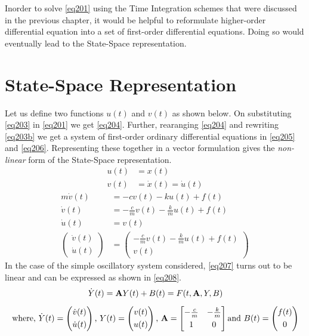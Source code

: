 Inorder to solve \cref{eq201} using the Time Integration schemes that were discussed in the previous chapter, it would be helpful to reformulate higher-order differential equation into a set of first-order differential equations. Doing so would eventually lead to the State-Space representation.
\section{State-Space Representation}
Let us define two functions $u(t)$ and $v(t)$ as shown below. On substituting \cref{eq203} in \cref{eq201} we get \cref{eq204}. Further, rearanging \cref{eq204} and rewriting \cref{eq203b} we get a system of first-order ordinary differential equations in \cref{eq205} and \cref{eq206}. Representing these together in a vector formulation gives the \emph{non-linear} form of the State-Space representation. 
\begin{subequations}\label{eq203}
\begin{align}
u(t) &= x(t) \label{eq203a}\\
v(t) &= \dot{x}(t) = \dot{u}(t)\label{eq203b}
\end{align}
\end{subequations}
\begin{align}
m \dot{v}(t) &= -cv(t) - ku(t) + f(t) \label{eq204}\\
\dot{v}(t) &= -\frac{c}{m} v(t) - \frac{k}{m} u(t) + f(t)\label{eq205}\\[3pt]
\dot{u}(t) &= v(t)\label{eq206}\\[10pt]
\begin{pmatrix}
\dot{v}(t) \\[3pt]
\dot{u}(t)
\end{pmatrix}
&= 
\begin{pmatrix}
-\frac{c}{m} v(t) - \frac{k}{m} u(t) + f(t) \\[3pt] 
v(t)
\end{pmatrix}\label{eq207}
\end{align}
In the case of the simple oscillatory system considered, \cref{eq207} turns out to be linear and can be expressed as shown in \cref{eq208}. 
\begin{gather}
\dot{Y}(t)\label{eq208}
= \mathbf{A} Y(t) + B(t) = F(t, \mathbf{A}, Y, B)\\[5pt]
\text{where, } 
\dot{Y}(t) =
\begin{pmatrix}
	\dot{v}(t) \\[3pt]
	\dot{u}(t)
\end{pmatrix}
\text{, }
Y(t) =
\begin{pmatrix}
	v(t) \\[3pt]
	u(t)
\end{pmatrix}
\text{, }
\mathbf{A} =
\begin{bmatrix}
		-\frac{c}{m} & - \frac{k}{m}\\[3pt]
		1 & 0
\end{bmatrix}
\text{and  } 
B(t) =
\begin{pmatrix}
f(t) \\[3pt] 
0
\end{pmatrix}\notag
\end{gather}
